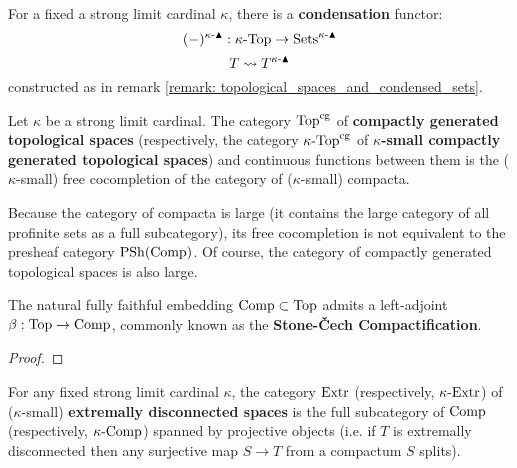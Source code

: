             \begin{definition}[Condensation] \label{def: condensation_of_topological_spaces}
                For a fixed a strong limit cardinal $\kappa$, there is a \textbf{condensation} functor:
                    $$(-)^{\kappa\text{-}\blacktriangle}: \kappa\text{-}\mathrm{Top} \to \mathrm{Sets}^{\kappa\text{-}\blacktriangle}$$
                    $$T \leadsto T^{\kappa\text{-}\blacktriangle}$$
                constructed as in remark \ref{remark: topological_spaces_and_condensed_sets}.
            \end{definition}
            \begin{definition} \label{def: compactly_generated_topological_spaces}
                Let $\kappa$ be a strong limit cardinal. The category $\mathrm{Top}^{\mathrm{cg}}$ of \textbf{compactly generated topological spaces} (respectively, the category $\kappa\text{-}\mathrm{Top}^{\mathrm{cg}}$ of \textbf{$\kappa$-small compactly generated topological spaces}) and continuous functions between them is the ($\kappa$-small) free cocompletion of the category of ($\kappa$-small) compacta. 
            \end{definition}
            \begin{remark}
                Because the category of compacta is large (it contains the large category of all profinite sets as a full subcategory), its free cocompletion is not equivalent to the presheaf category $\mathrm{PSh}(\mathrm{Comp})$. Of course, the category of compactly generated topological spaces is also large. 
            \end{remark}
            \begin{lemma} \label{lemma: the_stone_cech_compactification}
                The natural fully faithful embedding $\mathrm{Comp} \subset \mathrm{Top}$ admits a left-adjoint $\beta: \mathrm{Top} \to \mathrm{Comp}$, commonly known as the \textbf{Stone-\v{C}ech Compactification}.
            \end{lemma}
                \begin{proof}
                    
                \end{proof}
            \begin{definition} \label{def: extremally_disconnected_spaces}
                For any fixed strong limit cardinal $\kappa$, the category $\mathrm{Extr}$ (respectively, $\kappa\text{-}\mathrm{Extr}$) of ($\kappa$-small) \textbf{extremally disconnected spaces} is the full subcategory of $\mathrm{Comp}$ (respectively, $\kappa\text{-}\mathrm{Comp}$) spanned by projective objects (i.e. if $T$ is extremally disconnected then any surjective map $S \to T$ from a compactum $S$ splits). 
            \end{definition}
